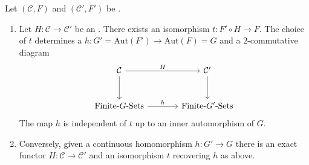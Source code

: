 \begin{lemma} \label{lemma:exact_fucntor_of_galois_categories_corresponds_to_homomorhpism_of_fundamental_groups}
    Let $(\mathcal{C}, F)$ and $(\mathcal{C}', F')$ be . 
    \begin{enumerate}
        \item 
    Let $H : \mathcal{C} \to \mathcal{C}'$ be an .
    There exists an isomorphism $t : F' \circ H \to F$. The choice of $t$ determines a   $h : G' = \text{Aut}(F') \to \text{Aut}(F) = G$ and a $2$-commutative diagram
    \[
    \begin{tikzcd}[column sep=large, row sep=large]
    \mathcal{C} \arrow[r, "H"] \arrow[d] & \mathcal{C}' \arrow[d] \\
    \text{Finite-}G\text{-Sets} \arrow[r, "h"] & \text{Finite-}G'\text{-Sets}
    \end{tikzcd}
    \]
    The map $h$ is independent of $t$ up to an inner automorphism of $G$. 

    \item  Conversely, given a continuous homomorphism $h : G' \to G$ there is an exact functor $H : \mathcal{C} \to \mathcal{C}'$ and an isomorphism $t$ recovering $h$ as above.
    \end{enumerate}
\end{lemma}